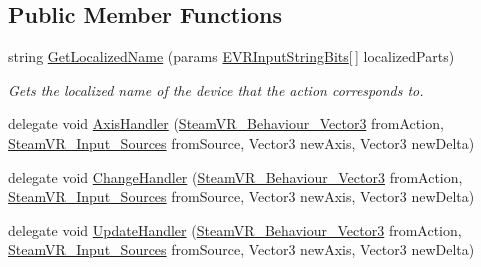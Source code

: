 \subsection*{Public Member Functions}
\begin{DoxyCompactItemize}
\item 
string \mbox{\hyperlink{class_valve_1_1_v_r_1_1_steam_v_r___behaviour___vector3_ad2338609404a6cb74b165e44fc89a606}{Get\+Localized\+Name}} (params \mbox{\hyperlink{namespace_valve_1_1_v_r_a05e76187bbc5846b9bfb44f6acf13912}{E\+V\+R\+Input\+String\+Bits}}\mbox{[}$\,$\mbox{]} localized\+Parts)
\begin{DoxyCompactList}\small\item\em Gets the localized name of the device that the action corresponds to. \end{DoxyCompactList}\item 
delegate void \mbox{\hyperlink{class_valve_1_1_v_r_1_1_steam_v_r___behaviour___vector3_a6599185cabefcb861406669fdb78ce8a}{Axis\+Handler}} (\mbox{\hyperlink{class_valve_1_1_v_r_1_1_steam_v_r___behaviour___vector3}{Steam\+V\+R\+\_\+\+Behaviour\+\_\+\+Vector3}} from\+Action, \mbox{\hyperlink{namespace_valve_1_1_v_r_a82e5bf501cc3aa155444ee3f0662853f}{Steam\+V\+R\+\_\+\+Input\+\_\+\+Sources}} from\+Source, Vector3 new\+Axis, Vector3 new\+Delta)
\item 
delegate void \mbox{\hyperlink{class_valve_1_1_v_r_1_1_steam_v_r___behaviour___vector3_acbfc7493b7f3400ae86a1dc7a1d8eebd}{Change\+Handler}} (\mbox{\hyperlink{class_valve_1_1_v_r_1_1_steam_v_r___behaviour___vector3}{Steam\+V\+R\+\_\+\+Behaviour\+\_\+\+Vector3}} from\+Action, \mbox{\hyperlink{namespace_valve_1_1_v_r_a82e5bf501cc3aa155444ee3f0662853f}{Steam\+V\+R\+\_\+\+Input\+\_\+\+Sources}} from\+Source, Vector3 new\+Axis, Vector3 new\+Delta)
\item 
delegate void \mbox{\hyperlink{class_valve_1_1_v_r_1_1_steam_v_r___behaviour___vector3_ad7c9905e6f1e489e71bf1a8f5a3cb4ec}{Update\+Handler}} (\mbox{\hyperlink{class_valve_1_1_v_r_1_1_steam_v_r___behaviour___vector3}{Steam\+V\+R\+\_\+\+Behaviour\+\_\+\+Vector3}} from\+Action, \mbox{\hyperlink{namespace_valve_1_1_v_r_a82e5bf501cc3aa155444ee3f0662853f}{Steam\+V\+R\+\_\+\+Input\+\_\+\+Sources}} from\+Source, Vector3 new\+Axis, Vector3 new\+Delta)
\end{DoxyCompactItemize}
